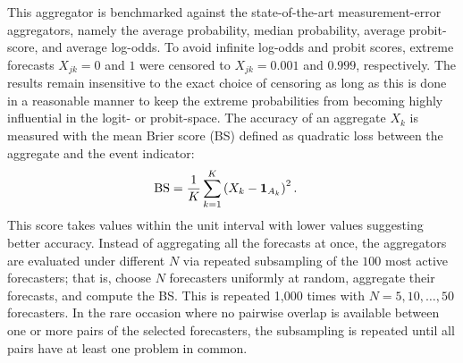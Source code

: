 \documentclass[11pt]{article}
\theoremstyle{definition}
\theoremstyle{definition}
\def\one{{\bf 1}}
\begin{document}
This aggregator is benchmarked against the state-of-the-art measurement-error aggregators, namely the average probability, median probability, average probit-score, and average log-odds. To avoid infinite log-odds
and probit scores, extreme forecasts $X_{jk} = 0$ and $1$ were
censored to $X_{jk} = 0.001$ and $0.999$, respectively. The results remain insensitive to the exact choice of censoring as long as this is done in a reasonable manner to keep the extreme probabilities from becoming highly influential in the logit- or probit-space. The accuracy of an aggregate $X_k$ is measured with the mean Brier score (BS) defined as quadratic loss between the aggregate and the event indicator:
 \begin{align*}
\text{BS} &= \frac{1}{K} \sum_{k=1}^K \left(X_k- \one_{A_k}\right)^2.
 \end{align*}
This score takes values within the unit interval with lower values suggesting better accuracy. Instead of aggregating all the forecasts at once, the aggregators are evaluated under different $N$ via repeated subsampling of the $100$ most active forecasters; that is, choose $N$ forecasters uniformly at random, aggregate their forecasts, and compute the BS. This is repeated 1,000 times with $N = 5, 10, \dots, 50$ forecasters. In the rare occasion where no pairwise overlap is available between one or more pairs of the selected forecasters, the subsampling is repeated until all pairs have at least one problem in common. 
\end{document}
